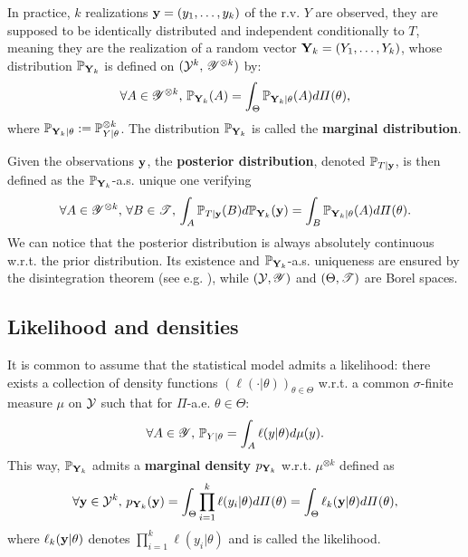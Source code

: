 In practice, $k$ realizations $\mathbf{y}= (y_1,\dots,y_k)$ of the r.v. $Y$ are observed, they are supposed to be identically distributed and independent conditionally to $T$, meaning they are the realization of a random vector $\mathbf{Y}_k = (Y_1,\dots,Y_k)$, whose distribution $\mathbb{P}_{\mathbf{Y}_k}$ is defined on $(\mathcal{Y}^k,\,\mathscr{Y}^{\otimes k})$ by:
\begin{equation}
    \forall A\in\mathscr{Y}^{\otimes k},\, \mathbb{P}_{\mathbf{Y}_k}(A) = \int_\Theta \mathbb{P}_{\mathbf{Y}_k|\theta}(A)d\varPi(\theta),
\end{equation}
where $\mathbb{P}_{\mathbf{Y}_k|\theta}:=\mathbb{P}_{Y|\theta}^{\otimes k}$. The distribution $\mathbb{P}_{\mathbf{Y}_k}$ is called the \textbf{marginal distribution}.

Given the observations $\mathbf{y}$, the \textbf{posterior distribution}, denoted $\mathbb{P}_{T|\mathbf{y}}$, is then defined as the $\mathbb{P}_{\mathbf{Y}_k}$-a.s. unique one verifying
    \begin{equation}
        \forall A\in\mathscr{Y}^{\otimes k},\,\forall B\in\mathscr{T},\, \int_{A}\mathbb{P}_{T|\mathbf{y}}(B)d\mathbb{P}_{\mathbf{Y}_k}(\mathbf{y}) = \int_B \mathbb{P}_{\mathbf{Y}_k|\theta}(A)d\varPi(\theta).
    \end{equation}
We can notice that the posterior distribution is always absolutely continuous w.r.t. the prior distribution.
Its existence and $\mathbb{P}_{\mathbf{Y}_k}$-a.s. uniqueness are ensured by the disintegration theorem (see e.g. \cite{chang_conditioning_1997}), while $(\mathcal{Y},\mathscr{Y})$ and $(\Theta,\mathscr{T})$ are Borel spaces.



\subsection{Likelihood and densities}\label{sec:intro-ref:likelihoods}


It is common to assume that the statistical model admits a likelihood: there exists a collection of density functions $(\ell(\cdot|\theta))_{\theta\in\Theta}$  w.r.t. a common  $\sigma$-finite measure $\mu$ on $\mathcal{Y}$ such that for $\varPi$-a.e. $\theta\in\Theta$:
    \begin{equation}
        \forall A\in\mathscr{Y},\,\mathbb{P}_{Y|\theta} = \int_A\ell(y|\theta)d\mu(y).
    \end{equation}
This way, $\mathbb{P}_{\mathbf{Y}_k}$ admits a \textbf{marginal density} $p_{\mathbf{Y}_k}$ w.r.t. $\mu^{\otimes k}$ defined as
    \begin{equation}
        \forall\mathbf{y}\in\mathcal{Y}^k,\, p_{\mathbf{Y}_k}(\mathbf{y}) = \int_\Theta\prod_{i=1}^k\ell(y_i|\theta) d\varPi(\theta) = \int_\Theta \ell_k(\mathbf{y}|\theta)d\varPi(\theta),
    \end{equation}
where $\ell_k(\mathbf{y}|\theta)$ denotes $\prod_{i=1}^k\ell(y_i|\theta)$ and is called the likelihood.

